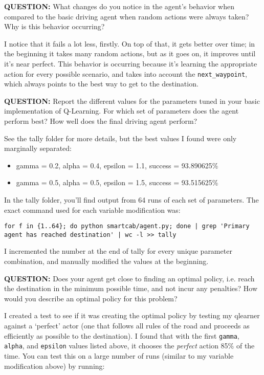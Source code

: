 \documentclass[11pt]{article}
\begin{document}
\textbf{QUESTION:} What changes do you notice in the agent's behavior when compared to the basic driving agent when random actions were always taken? Why is this behavior occurring?

I notice that it fails a lot less, firstly. On top of that, it gets better over time; in the beginning it takes many random actions, but as it goes on, it improves until it's near perfect. This behavior is occurring because it's learning the appropriate action for every possible scenario, and takes into account the \texttt{next\_waypoint}, which always points to the best way to get to the destination.

\textbf{QUESTION:} Report the different values for the parameters tuned in your basic implementation of Q-Learning. For which set of parameters does the agent perform best? How well does the final driving agent perform?

See the tally folder for more details, but the best values I found were only marginally separated:
\begin{itemize}
\item gamma = 0.2, alpha = 0.4, epsilon = 1.1, success = 93.890625\%
\item gamma = 0.5, alpha = 0.5, epsilon = 1.5, success = 93.515625\%
\end{itemize}

In the tally folder, you'll find output from 64 runs of each set of parameters. The exact command used for each variable modification was:

\begin{lstlisting}
for f in {1..64}; do python smartcab/agent.py; done | grep 'Primary agent has reached destination' | wc -l >> tally
\end{lstlisting}

I incremented the number at the end of tally for every unique parameter combination, and manually modified the values at the beginning.

\textbf{QUESTION:} Does your agent get close to finding an optimal policy, i.e. reach the destination in the minimum possible time, and not incur any penalties? How would you describe an optimal policy for this problem?

I created a test to see if it was creating the optimal policy by testing my qlearner against a `perfect' actor (one that follows all rules of the road and proceeds as efficiently as possible to the destination). I found that with the first \texttt{gamma}, \texttt{alpha}, and \texttt{epsilon} values listed above, it chooses the \emph{perfect} action 85\% of the time. You can test this on a large number of runs (similar to my variable modification above) by running:
\end{document}
